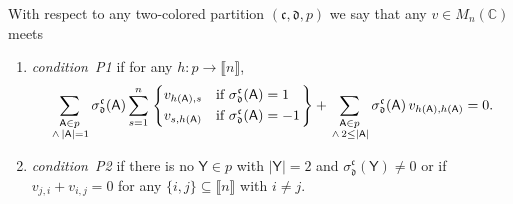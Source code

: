 \documentclass[10pt,a4paper]{amsart}
\numberwithin{equation}{section}
\newcommand{\tif}{\text{if }}
\newcommand{\Sand}{\,\wedge\,}
\newcommand{\comps}{\mathbb{C}}
\newcommand{\dwi}[1]{\llbracket{#1}\rrbracket}
\newcommand{\xfromto}[3]{#1 \colon  #2 \to #3}
\newcommand{\csx}[3]{\sigma^{#1}_{#2}(#3)}
\newcommand{\Yc}[1]{\mathfrak{#1}}
\newcommand{\Yb}[1]{\mathsf{#1}}
\newcommand{\squarematrices}[2]{M_{#1}(#2)}
\newcommand{\thedim}{n}
\newcommand{\conditionone}{P1}
\newcommand{\conditiontwo}{P2}
\begin{document}
{
  \newcommand{\somerel}{r}
  \newcommand{\indj}{j}
  \newcommand{\indi}{i}
  \newcommand{\inda}{a}
  \newcommand{\indb}{b}
  \newcommand{\sind}{s}
  \newcommand{\incol}{\Yc{c}}
  \newcommand{\outcol}{\Yc{d}}
  \newcommand{\incolx}[1]{\Yc{c}_{#1}}
  \newcommand{\outcolx}[1]{\Yc{d}_{#1}}
  \newcommand{\inlen}{k}
  \newcommand{\outlen}{\ell}
  \newcommand{\infree}{g}
  \newcommand{\outfree}{j}
  \newcommand{\infreex}[1]{g_{#1}}
  \newcommand{\outfreex}[1]{j_{#1}}
  \newcommand{\thepartition}{p}
  \newcommand{\themat}{v}
  \newcommand{\thematx}[2]{v_{#1,#2}}
  \newcommand{\thetuple}{x^\themat}
  \newcommand{\thetuplex}[1]{x_{#1}^\themat}
  \newcommand{\theind}{f}
  \newcommand{\theindx}[1]{f(#1)}
  \newcommand{\someblock}{\Yb{B}}
  \newcommand{\anyblock}{\Yb{A}}
  \newcommand{\blocklabeling}{h}
  \newcommand{\countblock}{\Yb{A}}
  \newcommand{\thetwoblock}{\Yb{Y}}
  \newcommand{\thelong}{\Yb{Z}}
  \newcommand{\thethreeblock}{\Yb{Z}}
  \begin{Definition}
    \label{definition:the_conditions}
With respect to  any two-colored partition  $(\incol,\outcol,\thepartition)$ we say that any
  $\themat\in\squarematrices{\thedim}{\comps}$ meets
    \begin{enumerate}
  \item \emph{condition~\conditionone{}} if for any $\xfromto{\blocklabeling}{\thepartition}{\dwi{\thedim}}$,
            \[
        \sum_{\substack{\countblock\in\thepartition\\{}\Sand |\countblock|=1}}\csx{\incol}{\outcol}{\countblock} \sum_{\sind=1}^\thedim
        \begin{rcases}
          \begin{dcases}
\thematx{\blocklabeling(\countblock)}{\sind}            & \tif \csx{\incol}{\outcol}{\countblock}=1\\
\thematx{\sind}{\blocklabeling(\countblock)}& \tif \csx{\incol}{\outcol}{\countblock}=-1
          \end{dcases}
        \end{rcases}
        +        \sum_{\substack{\countblock\in\thepartition\\{}\Sand 2\leq|\countblock|}}\csx{\incol}{\outcol}{\countblock}\,
        \thematx{\blocklabeling(\countblock)}{\blocklabeling(\countblock)}=0.
      \]
    \item \emph{condition~\conditiontwo{}} if there is no $\thetwoblock\in\thepartition$ with $|\thetwoblock|=2$ and $\csx{\incol}{\outcol}{\thetwoblock}\neq 0$ or if $\thematx{\indj}{\indi}+\thematx{\indi}{\indj}=0$ for any $\{\indi,\indj\}\subseteq \dwi{\thedim}$ with $\indi\neq \indj$.

\end{enumerate}
\end{Definition}}
\end{document}
